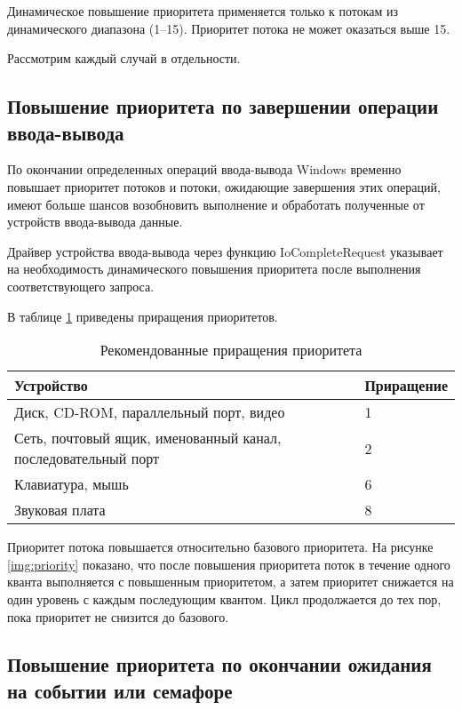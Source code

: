 Динамическое повышение приоритета применяется только к потокам из динамического диапазона (1--15). Приоритет потока не может оказаться выше 15.

Рассмотрим каждый случай в отдельности.

\subsection{Повышение приоритета по завершении операции ввода-вывода}

По окончании определенных операций ввода-вывода Windows временно повышает приоритет потоков и потоки, ожидающие завершения этих операций, имеют больше шансов возобновить выполнение и обработать полученные от устройств ввода-вывода данные.

Драйвер устройства ввода-вывода через функцию {\ttfamily IoCompleteRequest} указывает на необходимость динамического повышения приоритета после выполнения соответствующего запроса.

В таблице \ref{tbl:priorityinc} приведены приращения приоритетов.
\begin{table}[h]
	\caption{Рекомендованные приращения приоритета}
	\begin{center}
		\begin{tabular}{|p{100mm}|l|} 
			\hline
			\textbf{Устройство} & \textbf{Приращение} \\	
			\hline
			Диск, CD-ROM, параллельный порт, видео & 1 \\
			\hline
			Сеть, почтовый ящик, именованный канал, последовательный порт & 2 \\
			\hline
			Клавиатура, мышь & 6 \\
			\hline
			Звуковая плата & 8 \\
			\hline
		\end{tabular}
	\end{center}
	\label{tbl:priorityinc}
\end{table}

Приоритет потока повышается относительно базового приоритета. На рисунке \ref{img:priority} показано, что после повышения приоритета поток в течение одного кванта выполняется с повышенным приоритетом, а затем приоритет снижается на один уровень с каждым последующим квантом. Цикл продолжается до тех пор, пока приоритет не снизится до базового.


\subsection{Повышение приоритета по окончании ожидания на событии или семафоре}

